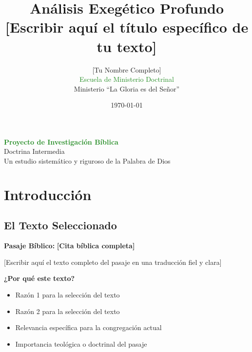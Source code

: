 \documentclass[12pt,a4paper]{article}
\title{\color{forestgreen}\Huge\textbf{Análisis Exegético Profundo}\\
\vspace{0.5cm}
\color{olivegreen}\Large [Escribir aquí el título específico de tu texto]}
\author{\color{sagegreen}\large [Tu Nombre Completo]\\
\textcolor{forestgreen}{Escuela de Ministerio Doctrinal}\\
\textcolor{olivegreen}{Ministerio ``La Gloria es del Señor''}}
\date{\color{ambergold}\large\today}
\newcommand{\versiculoclave}[1]{\textcolor{olivegreen}{\textbf{#1}}}
\begin{document}
\maketitle
\thispagestyle{empty}

\vspace{2cm}
\begin{center}
\begin{mdframed}[style=ImportantBox]
\centering
\textcolor{forestgreen}{\Large\textbf{Proyecto de Investigación Bíblica}}\\
\vspace{0.5cm}
\textcolor{olivegreen}{\large Doctrina Intermedia}\\
\vspace{0.5cm}
\textcolor{sagegreen}{Un estudio sistemático y riguroso de la Palabra de Dios}
\end{mdframed}
\end{center}

\newpage

\tableofcontents
\newpage

\section{Introducción}

\subsection{El Texto Seleccionado}

\begin{mdframed}[style=InfoBox]
\textbf{Pasaje Bíblico:} \versiculoclave{[Cita bíblica completa]}

\vspace{0.5cm}
[Escribir aquí el texto completo del pasaje en una traducción fiel y clara]
\end{mdframed}

\begin{mdframed}[style=AlertBox]
\textbf{¿Por qué este texto?}
\begin{itemize}[leftmargin=1.5em, rightmargin=0.5em]
    \item Razón 1 para la selección del texto
    \item Razón 2 para la selección del texto  
    \item Relevancia específica para la congregación actual
    \item Importancia teológica o doctrinal del pasaje
\end{itemize}
\end{mdframed}
\end{document}
